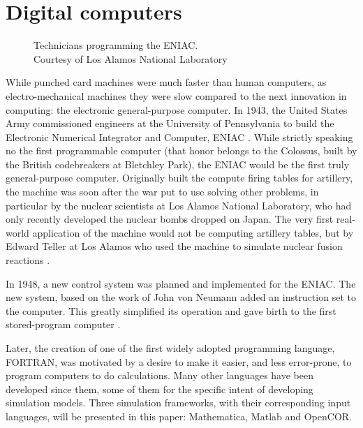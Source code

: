 \documentclass[\rootfolder/main.tex]{subfiles}
\begin{document}
\section{Digital computers}

\begin{wrapfigure}{R}{0.6\columnwidth}
    \caption[Technicians programming the ENIAC]
            {Technicians programming the ENIAC. \\ Courtesy of Los Alamos National Laboratory\label{fig:eniac}}
\end{wrapfigure}

While punched card machines were much faster than human computers, as electro-mechanical machines they were slow compared to the next innovation in computing: the electronic general-purpose computer.
In 1943, the United States Army commissioned engineers at the University of Pennsylvania to build the Electronic Numerical Integrator and Computer, ENIAC \cite{sep-computing-history}\cite{reed1952}.
While strictly speaking no the first programmable computer (that honor belongs to the Colossus, built by the British codebreakers at Bletchley Park\cite{winegrad1996}), the ENIAC would be the first truly general-purpose computer.
Originally built the compute firing tables for artillery, the machine was soon after the war put to use solving other problems, in particular by the nuclear scientists at Los Alamos National Laboratory, who had only recently developed the nuclear bombs dropped on Japan.
The very first real-world application of the machine would not be computing artillery tables, but by Edward Teller at Los Alamos who used the machine to simulate nuclear fusion reactions \cite{AtomicHeritageFoundation}.

In 1948, a new control system was planned and implemented for the ENIAC.
The new system, based on the work of John von Neumann \cite{VonNeumann1993} \cite{Haigh2014a} added an instruction set to the computer.
This greatly simplified its operation and gave birth to the first stored-program computer \cite{Rope2007}.

Later, the creation of one of the first widely adopted programming language, FORTRAN, was motivated by a desire to make it easier, and less error-prone, to program computers to do calculations.
Many other languages have been developed since them, some of them for the specific intent of developing simulation models.
Three simulation frameworks, with their corresponding input languages, will be presented in this paper: Mathematica, Matlab and OpenCOR.
\end{document}
